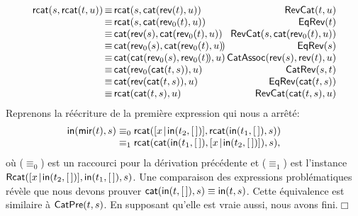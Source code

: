 \begin{equation*}
\begin{array}{@{}r@{\,}c@{\,}l@{\,}r@{}}
\fun{rcat}(s,\fun{rcat}(t,u))
& \equiv & \fun{rcat}(s,\fun{cat}(\fun{rev}(t),u))
& \IH{\pred{RevCat}{t,u}}\\
& \equiv & \fun{rcat}(s,\fun{cat}(\fun{rev}_0(t),u))
& \IH{\pred{EqRev}{t}}\\
& \equiv & \fun{cat}(\fun{rev}(s),\fun{cat}(\fun{rev}_0(t),u))
& \IH{\pred{RevCat}{s,\fun{cat}(\fun{rev}_0(t),u)}}\\
& \equiv & \fun{cat}(\fun{rev}_0(s),\fun{cat}(\fun{rev}_0(t),u)\!)
& \IH{\pred{EqRev}{s}}\\
& \equiv & \fun{cat}(\fun{cat}(\fun{rev}_0(s),\fun{rev}_0(t)\!),u)\!\!
& \IH{\pred{CatAssoc}{\fun{rev}(s),\fun{rev}(t),u}}\\
& \equiv & \fun{cat}(\fun{rev}_0(\fun{cat}(t,s)),u)
& \IH{\pred{CatRev}{s,t}}\\
& \equiv & \fun{cat}(\fun{rev}(\fun{cat}(t,s)),u)
& \IH{\pred{EqRev}{\fun{cat}(t,s)}}\\
& \equiv & \fun{rcat}(\fun{cat}(t,s),u)
& \IH{\pred{RevCat}{\fun{cat}(t,s),u}}
\end{array}
\end{equation*}
Reprenons la réécriture de la première expression qui nous a arrêté:
\begin{equation*}
\begin{array}{@{}r@{\;}c@{\;}l@{\qquad}r@{}}
\fun{in}(\fun{mir}(t),s)
& \equiv_0
& \fun{rcat}(\cons{x}{\fun{in}(t_2,\el)},
  \fun{rcat}(\fun{in}(t_1,\el),s))\\
& \equiv_1
& \fun{rcat}(\fun{cat}(\fun{in}(t_1,\el),
  \cons{x}{\fun{in}(t_2,\el)}), s),\index{rcat@\fun{rcat/2}|)}
\end{array}
\end{equation*}
où (\(\equiv_0\)) est un raccourci pour la dérivation précédente et
(\(\equiv_1\)) est l'instance
\(\textsf{Rcat}({[{x}\!\mid\!{\textsf{in}(t_2,[\,])}], \textsf{in}(t_1,[\,]),
  s})\). Une comparaison des expressions problématiques révèle que nous
devons prouver \(\textsf{cat}(\textsf{in}(t,[\,]),s) \equiv
\textsf{in}(t,s)\). Cette équivalence est similaire à
\(\textsf{CatPre}({t,s})\). En supposant
qu'elle est vraie aussi, nous avons fini.\hfill\(\Box\)

